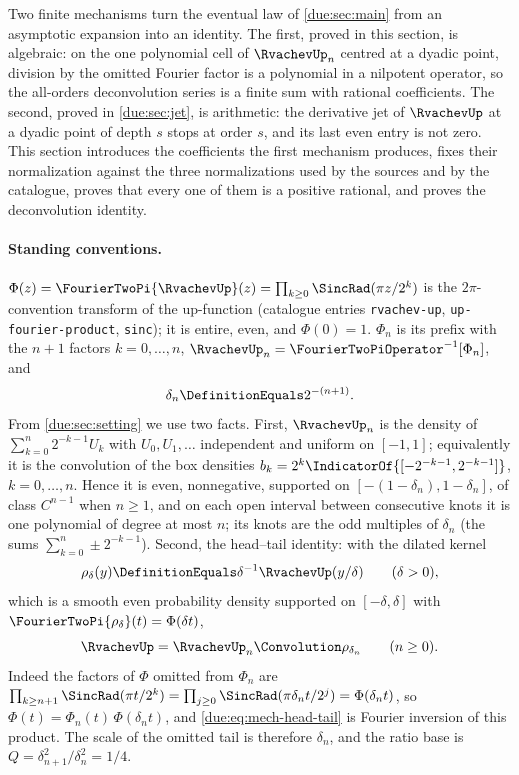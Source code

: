 \documentclass[11pt,oneside]{article}
\theoremstyle{plain}
\theoremstyle{definition}
\theoremstyle{remark}
\newcommand{\upn}[1]{\RvachevUp_{#1}}
\newcommand{\Phin}[1]{\Phi_{#1}}                            %
\newcommand{\PhiUp}{\Phi}                                   %
\newcommand{\Qq}{Q}                                         %
\begin{document}
Two finite mechanisms turn the eventual law of \cref{due:sec:main} from an
asymptotic expansion into an identity.  The first, proved in this section,
is algebraic: on the one polynomial cell of \(\upn{n}\) centred at a dyadic
point, division by the omitted Fourier factor is a polynomial in a nilpotent
operator, so the all-orders deconvolution series is a finite sum with
rational coefficients.  The second, proved in \cref{due:sec:jet}, is
arithmetic: the derivative jet of \(\RvachevUp\) at a dyadic point of depth
\(s\) stops at order \(s\), and its last even entry is not zero.  This
section introduces the coefficients the first mechanism produces, fixes
their normalization against the three normalizations used by the sources and
by the catalogue, proves that every one of them is a positive rational, and
proves the deconvolution identity.

\paragraph{Standing conventions.}
\(\PhiUp(z)=\FourierTwoPi{\RvachevUp}(z)=\prod_{k\ge0}\SincRad(\pi z/2^{k})\)
is the \(2\pi\)-convention transform of the up-function (catalogue entries
\texttt{rvachev-up}, \texttt{up-fourier-product}, \texttt{sinc}); it is
entire, even, and \(\PhiUp(0)=1\).  \(\Phin{n}\) is its prefix with the
\(n+1\) factors \(k=0,\ldots,n\), \(\upn{n}=\FourierTwoPiOperator^{-1}[\Phin{n}]\),
and
\[
 \delta_n\DefinitionEquals2^{-(n+1)} .
\]
From \cref{due:sec:setting} we use two facts.  First, \(\upn{n}\) is the
density of \(\sum_{k=0}^{n}2^{-k-1}U_k\) with \(U_0,U_1,\ldots\) independent
and uniform on \([-1,1]\); equivalently it is the convolution of the box
densities \(b_k=2^{k}\IndicatorOf{[-2^{-k-1},2^{-k-1}]}\), \(k=0,\ldots,n\).
Hence it is even, nonnegative, supported on \([-(1-\delta_n),1-\delta_n]\),
of class \(C^{n-1}\) when \(n\ge1\), and on each open interval between
consecutive knots it is one polynomial of degree at most \(n\); its knots are
the odd multiples of \(\delta_n\) (the sums \(\sum_{k=0}^{n}\pm2^{-k-1}\)).
Second, the head--tail identity: with the dilated kernel
\begin{equation}
 \rho_\delta(y)\DefinitionEquals\delta^{-1}\RvachevUp(y/\delta)
 \qquad(\delta>0),
 \label{due:eq:mech-dilated-kernel}
\end{equation}
which is a smooth even probability density supported on \([-\delta,\delta]\)
with \(\FourierTwoPi{\rho_\delta}(t)=\PhiUp(\delta t)\),
\begin{equation}
 \RvachevUp=\upn{n}\Convolution\rho_{\delta_n}\qquad(n\ge0).
 \label{due:eq:mech-head-tail}
\end{equation}
Indeed the factors of \(\PhiUp\) omitted from \(\Phin{n}\) are
\(\prod_{k\ge n+1}\SincRad(\pi t/2^{k})=\prod_{j\ge0}\SincRad(\pi\delta_nt/2^{j})
=\PhiUp(\delta_nt)\), so \(\PhiUp(t)=\Phin{n}(t)\,\PhiUp(\delta_nt)\), and
\cref{due:eq:mech-head-tail} is Fourier inversion of this product.  The
scale of the omitted tail is therefore \(\delta_n\), and the ratio base is
\(\Qq=\delta_{n+1}^{2}/\delta_n^{2}=1/4\).
\end{document}
